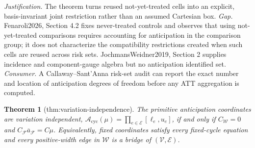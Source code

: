 \documentclass{article}
\newtheorem{theorem}{Theorem}
\begin{document}
\par\smallskip\noindent \textit{Justification.} The theorem turns reused not-yet-treated cells into an explicit, basis-invariant joint restriction rather than an assumed Cartesian box. \textit{Gap.} Fenaroli2026, Section 4.2 fixes never-treated controls and observes that using not-yet-treated comparisons requires accounting for anticipation in the comparison group; it does not characterize the compatibility restrictions created when such cells are reused across risk sets. JochmansWeidner2019, Section 2 supplies incidence and component-gauge algebra but no anticipation identified set. \textit{Consumer.} A Callaway--Sant'Anna risk-set audit can report the exact number and location of anticipation degrees of freedom before any ATT aggregation is computed.

\begin{theorem}[thm:variation-independence]\label{thm:variation-independence}
The primitive anticipation coordinates are variation independent, \(\mathcal A_{\mathrm{cyc}}(\mu)=\prod_{e\in\mathcal E}[\ell_e,u_e]\), if and only if \(C_{\mathcal W}=0\) and \(C_{\mathcal F}\overline a_{\mathcal F}=C\mu\). Equivalently, fixed coordinates satisfy every fixed-cycle equation and every positive-width edge in \(\mathcal W\) is a bridge of \((\mathcal V,\mathcal E)\).
\end{theorem}
\end{document}

